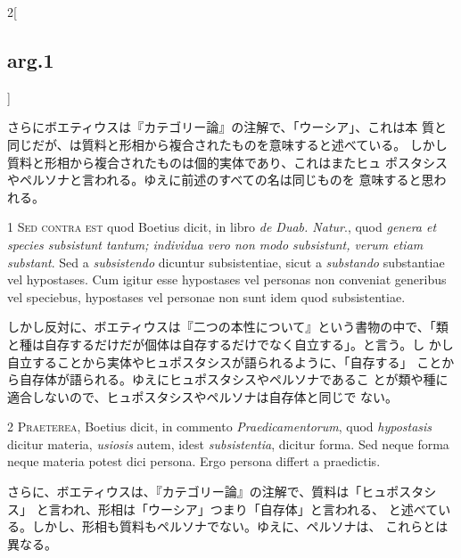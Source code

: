 \documentclass[paper=a4paper,fontsize=10pt,jafontsize=9pt,titlepage]{jlreq}
\begin{document}
\begin{paracol}{2}[\subsection{arg.1}]
\switchcolumn

さらにボエティウスは『カテゴリー論』の注解で、「ウーシア」、これは本
 質と同じだが、は質料と形相から複合されたものを意味すると述べている。
 しかし質料と形相から複合されたものは個的実体であり、これはまたヒュ
 ポスタシスやペルソナと言われる。ゆえに前述のすべての名は同じものを
 意味すると思われる。

\switchcolumn*[\subsection{s.c.}]

1 {\scshape Sed contra est} quod Boetius dicit, in libro {\itshape de Duab. Natur}., quod {\itshape genera
et species subsistunt tantum; individua vero non modo subsistunt, verum
etiam substant}. Sed a {\itshape subsistendo} dicuntur subsistentiae, sicut a
{\itshape substando} substantiae vel hypostases. Cum igitur esse hypostases vel
personas non conveniat generibus vel speciebus, hypostases vel personae
non sunt idem quod subsistentiae.

\switchcolumn

しかし反対に、ボエティウスは『二つの本性について』という書物の中で、「類
 と種は自存するだけだが個体は自存するだけでなく自立する」。と言う。し
 かし自立することから実体やヒュポスタシスが語られるように、「自存する」
 ことから自存体が語られる。ゆえにヒュポスタシスやペルソナであるこ
 とが類や種に適合しないので、ヒュポスタシスやペルソナは自存体と同じで
 ない。


2 {\scshape Praeterea}, Boetius dicit, in commento {\itshape Praedicamentorum}, quod {\itshape hypostasis}
dicitur materia, {\itshape usiosis} autem, idest {\itshape subsistentia}, dicitur forma. Sed
neque forma neque materia potest dici persona. Ergo persona differt a
praedictis.

\switchcolumn

さらに、ボエティウスは、『カテゴリー論』の注解で、質料は「ヒュポスタシス」
 と言われ、形相は「ウーシア」つまり「自存体」と言われる、
 と述べている。しかし、形相も質料もペルソナでない。ゆえに、ペルソナは、
 これらとは異なる。



\end{paracol}
\end{document}
